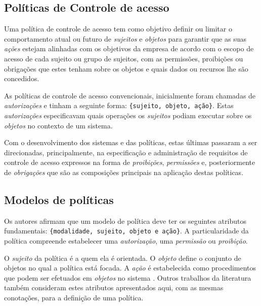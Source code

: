 \subsection{Políticas de Controle de acesso}\label{controle_acesso}

Uma política de controle de acesso tem como objetivo definir ou limitar o comportamento atual ou futuro de \textit{sujeitos} e \textit{objetos} para garantir que as suas \textit{ações} estejam alinhadas com os objetivos da empresa de acordo com o escopo de acesso de cada sujeito ou grupo de sujeitos, com as permissões, proibições ou obrigações que estes tenham sobre os objetos e quais dados ou recursos lhe são concedidos. \cite{dunlop_dynamic_2002}\cite{sarkis2017}

As políticas de controle de acesso convencionais, inicialmente foram chamadas de \textit{autorizações} e tinham a seguinte forma: \verb|{sujeito, objeto, ação}|. Estas \textit{autorizações} especificavam quais operações os \textit{sujeitos} podiam executar sobre os \textit{objetos} no contexto de um sistema. \cite{di_vimercati_policies_2005}\cite{sarkis2017}

Com o desenvolvimento dos sistemas e das políticas, estas últimas passaram a ser direcionadas, principalmente, na especificação e administração de requisitos de controle de acesso expressos na forma de \textit{proibições}, \textit{permissões }e, posteriormente de \textit{obrigações} que são as composições principais na aplicação destas políticas. \cite{sarkar_2017}

\subsection{Modelos de políticas}\label{modelo_politicas}
Os autores \cite{moffett_policy_1994} afirmam que um modelo de política deve ter os seguintes atributos fundamentais: \verb|{modalidade, sujeito, objeto e ação}|. A particularidade da política compreende estabelecer uma \textit{autorização}, uma \textit{permissão} ou \textit{proibição}. 

O \textit{sujeito }da política é a quem ela é orientada. O \textit{objeto} define o conjunto de objetos no qual a política está focada. A \textit{ação} é estabelecida como procedimentos que podem ser efetuados em \textit{objetos} no sistema \cite{moffett_policy_1994}. Outros trabalhos da literatura também consideram estes atributos apresentados aqui, com as mesmas conotações, para a definição de uma política. \cite{sarkis2017}


